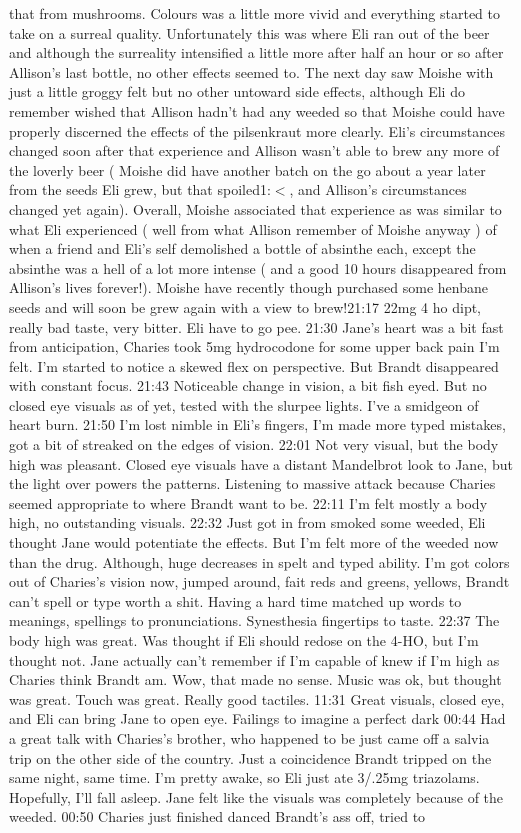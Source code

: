 \documentclass[12pt]{book}
\begin{document}
that from mushrooms. Colours was a little more vivid and everything started to take on a surreal quality. Unfortunately this was where Eli ran out of the beer and although the surreality intensified a little more after half an hour or so after Allison's last bottle, no other effects seemed to. The next day saw Moishe with just a little groggy felt but no other untoward side effects, although Eli do remember wished that Allison hadn't had any weeded so that Moishe could have properly discerned the effects of the pilsenkraut more clearly. Eli's circumstances changed soon after that experience and Allison wasn't able to brew any more of the loverly beer ( Moishe did have another batch on the go about a year later from the seeds Eli grew, but that spoiled1:$<$, and Allison's circumstances changed yet again). Overall, Moishe associated that experience as was similar to what Eli experienced ( well from what Allison remember of Moishe anyway ) of when a friend and Eli's self demolished a bottle of absinthe each, except the absinthe was a hell of a lot more intense ( and a good 10 hours disappeared from Allison's lives forever!). Moishe have recently though purchased some henbane seeds and will soon be grew again with a view to brew!21:17 22mg 4 ho dipt, really bad taste, very bitter. Eli have to go pee. 21:30 Jane's heart was a bit fast from anticipation, Charies took 5mg hydrocodone for some upper back pain I'm felt. I'm started to notice a skewed flex on perspective. But Brandt disappeared with constant focus. 21:43 Noticeable change in vision, a bit fish eyed. But no closed eye visuals as of yet, tested with the slurpee lights. I've a smidgeon of heart burn. 21:50 I'm lost nimble in Eli's fingers, I'm made more typed mistakes, got a bit of streaked on the edges of vision. 22:01 Not very visual, but the body high was pleasant. Closed eye visuals have a distant Mandelbrot look to Jane, but the light over powers the patterns. Listening to massive attack because Charies seemed appropriate to where Brandt want to be. 22:11 I'm felt mostly a body high, no outstanding visuals. 22:32 Just got in from smoked some weeded, Eli thought Jane would potentiate the effects. But I'm felt more of the weeded now than the drug. Although, huge decreases in spelt and typed ability. I'm got colors out of Charies's vision now, jumped around, fait reds and greens, yellows, Brandt can't spell or type worth a shit. Having a hard time matched up words to meanings, spellings to pronunciations. Synesthesia fingertips to taste. 22:37 The body high was great. Was thought if Eli should redose on the 4-HO, but I'm thought not. Jane actually can't remember if I'm capable of knew if I'm high as Charies think Brandt am. Wow, that made no sense. Music was ok, but thought was great. Touch was great. Really good tactiles. 11:31 Great visuals, closed eye, and Eli can bring Jane to open eye. Failings to imagine a perfect dark 00:44 Had a great talk with Charies's brother, who happened to be just came off a salvia trip on the other side of the country. Just a coincidence Brandt tripped on the same night, same time. I'm pretty awake, so Eli just ate 3/.25mg triazolams. Hopefully, I'll fall asleep. Jane felt like the visuals was completely because of the weeded. 00:50 Charies just finished danced Brandt's ass off, tried to 
\end{document}
